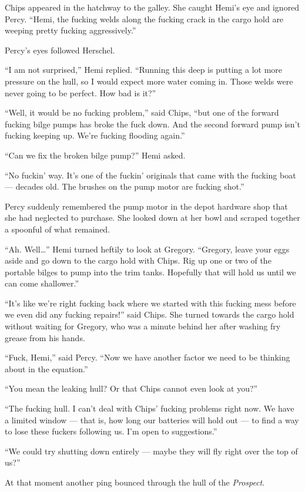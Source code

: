 \documentclass[
]{scrbook}
\begin{document}
Chips appeared in the hatchway to the galley. She caught Hemi's eye and
ignored Percy. ``Hemi, the fucking welds along the fucking crack in the
cargo hold are weeping pretty fucking aggressively.''

Percy's eyes followed Herschel.

``I am not surprised,'' Hemi replied. ``Running this deep is putting a
lot more pressure on the hull, so I would expect more water coming in.
Those welds were never going to be perfect. How bad is it?''

``Well, it would be no fucking problem,'' said Chips, ``but one of the
forward fucking bilge pumps has broke the fuck down. And the second
forward pump isn't fucking keeping up. We're fucking flooding again.''

``Can we fix the broken bilge pump?'' Hemi asked.

``No fuckin' way. It's one of the fuckin' originals that came with the
fucking boat --- decades old. The brushes on the pump motor are fucking
shot.''

Percy suddenly remembered the pump motor in the depot hardware shop that
she had neglected to purchase. She looked down at her bowl and scraped
together a spoonful of what remained.

``Ah. Well\ldots{}'' Hemi turned heftily to look at Gregory. ``Gregory,
leave your eggs aside and go down to the cargo hold with Chips. Rig up
one or two of the portable bilges to pump into the trim tanks. Hopefully
that will hold us until we can come shallower.''

``It's like we're right fucking back where we started with this fucking
mess before we even did any fucking repairs!'' said Chips. She turned
towards the cargo hold without waiting for Gregory, who was a minute
behind her after washing fry grease from his hands.

``Fuck, Hemi,'' said Percy. ``Now we have another factor we need to be
thinking about in the equation.''

``You mean the leaking hull? Or that Chips cannot even look at you?''

``The fucking hull. I can't deal with Chips' fucking problems right now.
We have a limited window --- that is, how long our batteries will hold
out --- to find a way to lose these fuckers following us. I'm open to
suggestions.''

``We could try shutting down entirely --- maybe they will fly right over
the top of us?''

At that moment another ping bounced through the hull of the
\emph{Prospect}.
\end{document}
